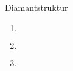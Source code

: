 \documentclass{alex_hü}
\begin{document}
\renewcommand{\labelenumi}{\alph{enumi})}


\begin{mybox}{Diamantstruktur}
	\centering \(  \)
	\tcblower
	\begin{enumerate}
		\item \(  \)
%			
	\tcbline
		\item \(  \)
%		
	\tcbline
		\item \(  \)
%			
	\end{enumerate}
\end{mybox}
\end{document}

